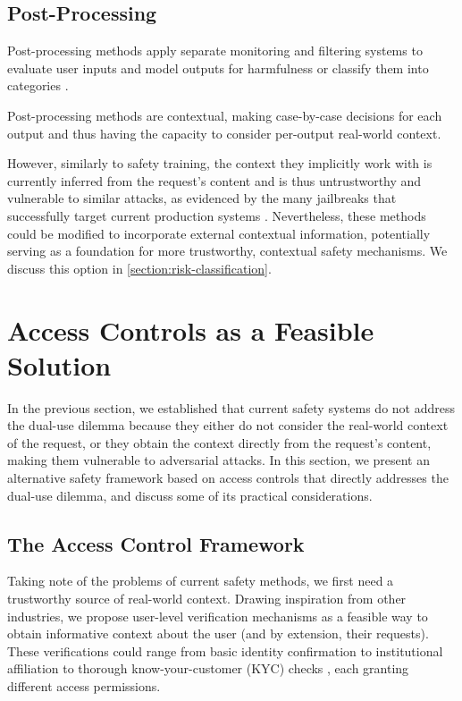\documentclass{article}
\theoremstyle{plain}
\theoremstyle{definition}
\theoremstyle{remark}
\begin{document}
\subsection{Post-Processing}

Post-processing methods apply separate monitoring and filtering
systems to evaluate user inputs and model outputs for harmfulness
\cite{inan2023llamaguardllmbasedinputoutput,
sharma2025constitutionalclassifiersdefendinguniversal} or classify
them into categories \cite{handa2025economictasksperformedai}.

Post-processing methods are contextual, making case-by-case decisions
for each output and thus having the capacity to consider per-output
real-world context.

However, similarly to safety training, the context they implicitly
work with is currently inferred from the request's content and is
thus untrustworthy and vulnerable to similar attacks, as evidenced by
the many jailbreaks that successfully target current production
systems \cite{zhang2025outputconstraintsattacksurface}. Nevertheless,
these methods could be modified to incorporate external contextual
information, potentially serving as a foundation for more
trustworthy, contextual safety mechanisms. We discuss this option in
\cref{section:risk-classification}.

\section{Access Controls as a Feasible Solution}
\label{section:access-controls}

In the previous section, we established that current safety systems
do not address the dual-use dilemma because they either do not
consider the real-world context of the request, or they obtain the
context directly from the request's content, making them vulnerable
to adversarial attacks. In this section, we present an alternative
safety framework based on access controls that directly addresses the
dual-use dilemma, and discuss some of its practical considerations.

\subsection{The Access Control Framework}

Taking note of the problems of current safety methods, we first need
a trustworthy source of real-world context. Drawing inspiration from
other industries, we propose user-level verification mechanisms as a
feasible way to obtain informative context about the user (and by
extension, their requests). These verifications could range from
basic identity confirmation to institutional affiliation to thorough
know-your-customer (KYC) checks \cite{FATF2025}, each granting
different access permissions.
\end{document}
